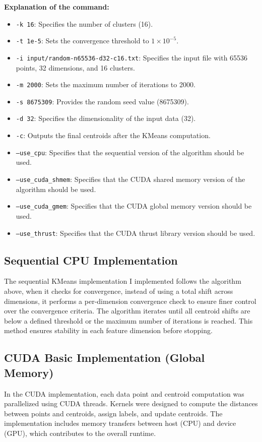\documentclass[letterpaper,12pt]{article}
\theoremstyle{remark}
\begin{document}
\textbf{Explanation of the command:}
\begin{itemize}
    \item \texttt{-k 16}: Specifies the number of clusters (16).
    \item \texttt{-t 1e-5}: Sets the convergence threshold to $1 \times 10^{-5}$.
    \item \texttt{-i input/random-n65536-d32-c16.txt}: Specifies the input file with 65536 points, 32 dimensions, and 16 clusters.
    \item \texttt{-m 2000}: Sets the maximum number of iterations to 2000.
    \item \texttt{-s 8675309}: Provides the random seed value (8675309).
    \item \texttt{-d 32}: Specifies the dimensionality of the input data (32).
    \item \texttt{-c}: Outputs the final centroids after the KMeans computation.
    \item \texttt{--use\_cpu}: Specifies that the sequential version of the algorithm should be used.
    \item \texttt{--use\_cuda\_shmem}: Specifies that the CUDA shared memory version of the algorithm should be used.
    \item \texttt{--use\_cuda\_gmem}: Specifies that the CUDA global memory version should be used.
    \item \texttt{--use\_thrust}: Specifies that the CUDA thrust library version should be used.

\end{itemize}

\clearpage
\subsection{Sequential CPU Implementation}
The sequential KMeans implementation I implemented follows the algorithm above, when it checks for convergence, instead of using a total shift across dimensions, it performs a per-dimension convergence check to ensure finer control over the convergence criteria. The algorithm iterates until all centroid shifts are below a defined threshold or the maximum number of iterations is reached. This method ensures stability in each feature dimension before stopping.


\subsection{CUDA Basic Implementation (Global Memory)}
In the CUDA implementation, each data point and centroid computation was parallelized using CUDA threads. Kernels were designed to compute the distances between points and centroids, assign labels, and update centroids. The implementation includes memory transfers between host (CPU) and device (GPU), which contributes to the overall runtime.
\end{document}
